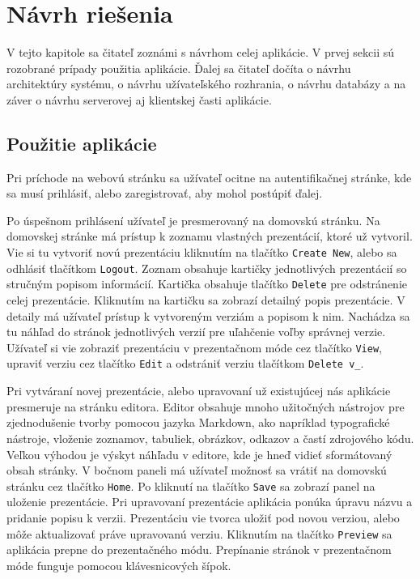 \chapter{Návrh riešenia}
\label{kapitola4}
V tejto kapitole sa čitateľ zoznámi s návrhom celej aplikácie. V prvej sekcii sú rozobrané prípady použitia aplikácie. Ďalej sa čitateľ dočíta o návrhu architektúry systému, o návrhu užívateľského rozhrania, o návrhu databázy a na záver o návrhu serverovej aj klientskej časti aplikácie.

\section{Použitie aplikácie}
\label{pouzitie}
Pri príchode na webovú stránku sa užívateľ ocitne na autentifikačnej stránke, kde sa musí prihlásiť, alebo zaregistrovať, aby mohol postúpiť ďalej.

Po úspešnom prihlásení užívateľ je presmerovaný na domovskú stránku. Na domovskej stránke má prístup k zoznamu vlastných prezentácií, ktoré už vytvoril. Vie si tu vytvoriť novú prezentáciu kliknutím na tlačítko \texttt{Create New}, alebo sa odhlásiť tlačítkom \texttt{Logout}. Zoznam obsahuje kartičky jednotlivých prezentácií so stručným popisom informácií. Kartička obsahuje tlačítko \texttt{Delete} pre odstránenie celej prezentácie. Kliknutím na kartičku sa zobrazí detailný popis prezentácie. V detaily má užívateľ prístup k vytvoreným verziám a popisom k nim. Nachádza sa tu náhľad do stránok jednotlivých verzií pre uľahčenie voľby správnej verzie. Užívateľ si vie zobraziť prezentáciu v prezentačnom móde cez tlačítko \texttt{View}, upraviť verziu cez tlačítko \texttt{Edit} a odstrániť verziu tlačítkom \texttt{Delete v\_}.

Pri vytváraní novej prezentácie, alebo upravovaní už existujúcej nás aplikácie presmeruje na stránku editora. Editor obsahuje mnoho užitočných nástrojov pre zjednodušenie tvorby pomocou jazyka Markdown, ako napríklad typografické nástroje, vloženie zoznamov, tabuliek, obrázkov, odkazov a častí zdrojového kódu. Veľkou výhodou je výskyt náhľadu v editore, kde je hneď vidieť sformátovaný obsah stránky. V bočnom paneli má užívateľ možnosť sa vrátiť na domovskú stránku cez tlačítko \texttt{Home}. Po kliknutí na tlačítko \texttt{Save} sa zobrazí panel na uloženie prezentácie. Pri upravovaní prezentácie aplikácia ponúka úpravu názvu a pridanie popisu k verzii. Prezentáciu vie tvorca uložiť pod novou verziou, alebo môže aktualizovať práve upravovanú verziu. Kliknutím na tlačítko \texttt{Preview} sa aplikácia prepne do prezentačného módu. Prepínanie stránok v prezentačnom móde funguje pomocou klávesnicových šípok. 

